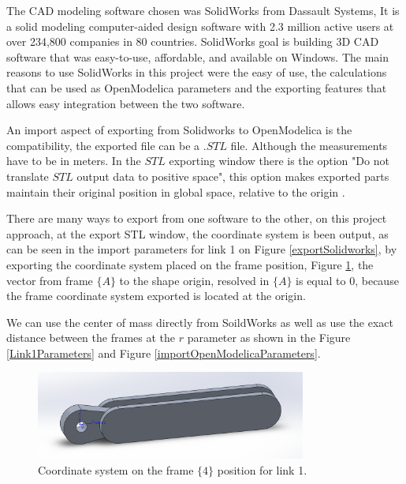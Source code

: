 \documentclass[transmag]{IEEEtran}
\begin{document}
The CAD modeling software chosen was SolidWorks from Dassault Systems, It is a solid modeling computer-aided design software with 2.3 million active users at over 234,800 companies in 80 countries. \cite{ref5} SolidWorks goal is building 3D CAD software that was easy-to-use, affordable, and available on Windows. \cite{ref6}
The main reasons to use SolidWorks in this project were the easy of use, the calculations that can be used as OpenModelica parameters and the exporting features that allows easy integration between the two software.

An import aspect of exporting from Solidworks to OpenModelica is the compatibility, the exported file can be a $.STL$ file. Although the measurements have to be in meters.
In the $STL$ exporting window there is the option "Do not translate $STL$ output data to positive space", this option makes exported parts maintain their original position in global space, relative to the origin \cite{ref4}. 

There are many ways to export from one software to the other, on this project approach, at the export STL window, the coordinate system is been output, as can be seen in the import parameters for link 1 on Figure \ref{exportSolidworks}, by exporting the coordinate system placed on the frame position, Figure \ref{Link1Model}, the vector from frame $\{A\}$ to the shape origin, resolved in $\{A\}$ is equal to 0, because the frame coordinate system exported is located at the origin.

We can use the center of mass directly from SoildWorks as well as use the exact distance between the frames at the $r$ parameter as shown in the Figure \ref{Link1Parameters} and Figure \ref{importOpenModelicaParameters}.



\begin{figure}
\centerline{\includegraphics[width=3.5in]{./images/Link1Model}}
\caption{Coordinate system on the frame $\{4\}$ position for link 1.\label{Link1Model}}
\end{figure}
\end{document}
